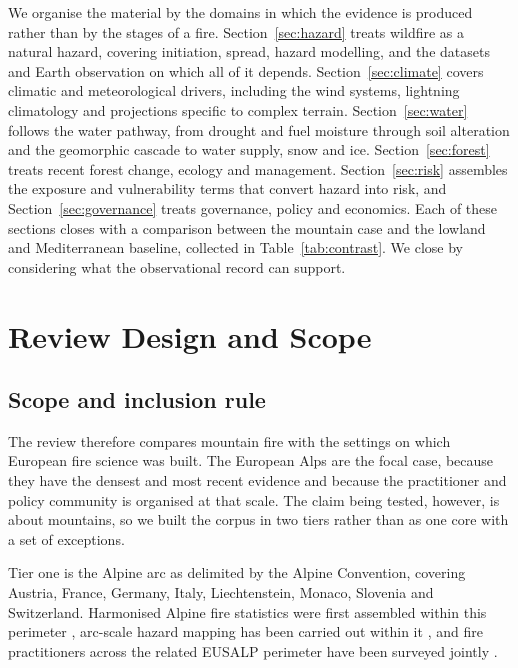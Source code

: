 \documentclass[11pt,a4paper]{article}
\begin{document}
We organise the material by the domains in which the evidence is produced rather than by the stages of a fire. Section~\ref{sec:hazard} treats wildfire as a natural hazard, covering initiation, spread, hazard modelling, and the datasets and Earth observation on which all of it depends. Section~\ref{sec:climate} covers climatic and meteorological drivers, including the wind systems, lightning climatology and projections specific to complex terrain. Section~\ref{sec:water} follows the water pathway, from drought and fuel moisture through soil alteration and the geomorphic cascade to water supply, snow and ice. Section~\ref{sec:forest} treats recent forest change, ecology and management. Section~\ref{sec:risk} assembles the exposure and vulnerability terms that convert hazard into risk, and Section~\ref{sec:governance} treats governance, policy and economics. Each of these sections closes with a comparison between the mountain case and the lowland and Mediterranean baseline, collected in Table~\ref{tab:contrast}. We close by considering what the observational record can support.

\section{Review Design and Scope}
\label{sec:scope}

\subsection{Scope and inclusion rule}

The review therefore compares mountain fire with the settings on which European fire science was built. The European Alps are the focal case, because they have the densest and most recent evidence and because the practitioner and policy community is organised at that scale. The claim being tested, however, is about mountains, so we built the corpus in two tiers rather than as one core with a set of exceptions.

Tier one is the Alpine arc as delimited by the Alpine Convention, covering Austria, France, Germany, Italy, Liechtenstein, Monaco, Slovenia and Switzerland. Harmonised Alpine fire statistics were first assembled within this perimeter \citep{valese_wildfires_2011, muller_forest_2020}, arc-scale hazard mapping has been carried out within it \citep{gerberding_mapping_2025}, and fire practitioners across the related EUSALP perimeter have been surveyed jointly \citep{hoang_stakeholders_2026}.
\end{document}
